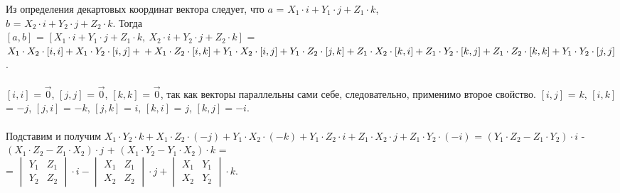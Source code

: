 \begin{Proof}
	Из определения декартовых координат вектора следует, что $a$ = $X_1 \cdot i + Y_1 \cdot j + Z_1 \cdot k$, \\ $b$ = $X_2 \cdot i + Y_2 \cdot j + Z_2 \cdot k$. Тогда \\ $[a, b]$ = $[X_1 \cdot i + Y_1 \cdot j + Z_1 \cdot k, \ X_2 \cdot i + Y_2 \cdot j + Z_2 \cdot k]$ = $X_1 \cdot X_2 \cdot [i, i] + X_1 \cdot Y_2 \cdot [i, j] + \\ + X_1 \cdot Z_2 \cdot [i, k] + Y_1 \cdot X_2 \cdot [i, j] + Y_1 \cdot Z_2 \cdot [j, k] + Z_1 \cdot X_2 \cdot [k, i] + Z_1 \cdot Y_2 \cdot [k, j] + Z_1 \cdot Z_2 \cdot [k, k] + Y_1 \cdot Y_2 \cdot [j, j]$. \\\\
	$[i,i]$ = $\overrightarrow{0}$, $[j,j]$ = $\overrightarrow{0}$, $[k,k]$ = $\overrightarrow{0}$, так как векторы параллельны сами себе, следовательно, применимо второе свойство. $[i,j]$ = $k$, $[i,k]$ = $-j$, $[j,i]$ = $-k$,  $[j,k]$ = $i$, $[k,i]$ = $j$, $[k,j] = -i$. \\\\
	Подставим и получим $X_1 \cdot Y_2 \cdot k + X_1 \cdot Z_2 \cdot (-j) + Y_1 \cdot X_2 \cdot (-k) + Y_1 \cdot Z_2 \cdot i + Z_1 \cdot X_2 \cdot j + Z_1 \cdot Y_2 \cdot (-i)$ = $(Y_1 \cdot Z_2 - Z_1 \cdot Y_2) \cdot i$ - $(X_1 \cdot Z_2 - Z_1 \cdot X_2) \cdot j$ + $(X_1 \cdot Y_2 - Y_1 \cdot X_2) \cdot k$ = \\ = $\begin{vmatrix} Y_1 & Z_1 \\ Y_2 & Z_2 \end{vmatrix} \cdot i - \begin{vmatrix} X_1 & Z_1 \\ X_2 & Z_2 \end{vmatrix} \cdot j + \begin{vmatrix} X_1 & Y_1 \\ X_2 & Y_2 \end{vmatrix} \cdot k$.
\end{Proof}




